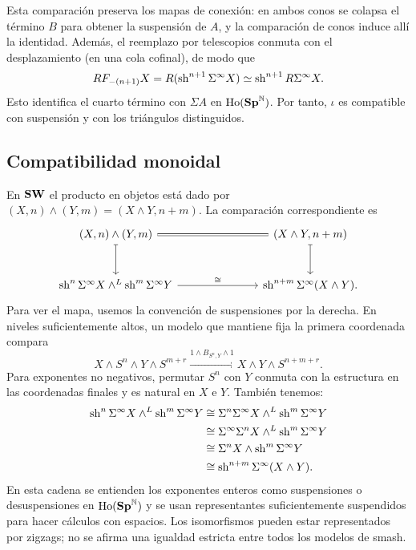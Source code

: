 Esta comparación preserva los mapas de conexión: en ambos conos se colapsa el término $B$ para obtener la suspensión de $A$, y la comparación de conos induce allí la identidad. Además, el reemplazo por telescopios conmuta con el desplazamiento (en una cola cofinal), de modo que
\[
RF_{-(n+1)}X=R(\operatorname{sh}^{n+1}\Sigma^\infty X)
\simeq\operatorname{sh}^{n+1}R\Sigma^\infty X.
\]
Esto identifica el cuarto término con $\Sigma A$ en $\operatorname{Ho}(\mathbf{Sp}^{\mathbb N})$. Por tanto, $\iota$ es compatible con suspensión y con los triángulos distinguidos.

\subsection{Compatibilidad monoidal}
En $\mathbf{SW}$ el producto en objetos está dado por
$(X,n)\wedge(Y,m)=(X\wedge Y,n+m)$. La comparación correspondiente es
\[
\begin{tikzcd}[column sep=large,row sep=large]
(X,n)\wedge(Y,m)\arrow[rr,equal]\arrow[d,mapsto]&&(X\wedge Y,n+m)\arrow[d,mapsto]\\
\sh^n\Sigma^\infty X\wedge^L\sh^m\Sigma^\infty Y\arrow[rr,"\cong"]&&\sh^{n+m}\Sigma^\infty(X\wedge Y).
\end{tikzcd}
\]
Para ver el mapa, usemos la convención de suspensiones por la derecha. En niveles suficientemente altos, un modelo que mantiene fija la primera coordenada compara
\[
X\wedge S^n\wedge Y\wedge S^{m+r}
\xrightarrow{1\wedge B_{S^n,Y}\wedge1}
X\wedge Y\wedge S^{n+m+r}.
\]
Para exponentes no negativos, permutar $S^n$ con $Y$ conmuta con la estructura en las coordenadas finales y es natural en $X$ e $Y$. También tenemos:
\[
\begin{aligned}
\operatorname{sh}^n\Sigma^\infty X\wedge^L\operatorname{sh}^m\Sigma^\infty Y
&\cong\Sigma^n\Sigma^\infty X\wedge^L\operatorname{sh}^m\Sigma^\infty Y\\
&\cong\Sigma^\infty\Sigma^nX\wedge^L\operatorname{sh}^m\Sigma^\infty Y\\
&\cong\Sigma^nX\wedge\operatorname{sh}^m\Sigma^\infty Y\\
&\cong\operatorname{sh}^{n+m}\Sigma^\infty(X\wedge Y).
\end{aligned}
\]
En esta cadena se entienden los exponentes enteros como suspensiones o desuspensiones en $\operatorname{Ho}(\mathbf{Sp}^{\mathbb N})$ y se usan representantes suficientemente suspendidos para hacer cálculos con espacios. Los isomorfismos pueden estar representados por zigzags; no se afirma una igualdad estricta entre todos los modelos de smash.

